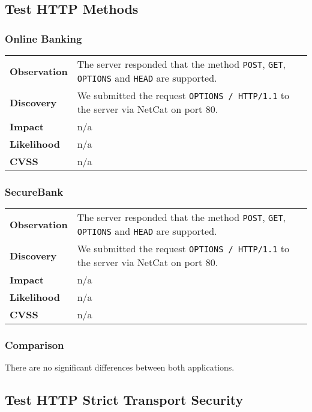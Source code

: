 \subsection{Test HTTP Methods}

\subsubsection*{Online Banking}

\begin{tabular}{l|p{10cm}}

\textbf{Observation} & The server responded that the method \texttt{POST}, \texttt{GET}, \texttt{OPTIONS} and \texttt{HEAD} are supported.  \\
\textbf{Discovery} & We submitted the request \texttt{OPTIONS / HTTP/1.1} to the server via NetCat on port 80. \\
\textbf{Impact} & n/a \\
\textbf{Likelihood} & n/a \\
\textbf{CVSS} & n/a \\
\end{tabular}


\subsubsection*{SecureBank}

\begin{tabular}{l|p{10cm}}

\textbf{Observation} & The server responded that the method \texttt{POST}, \texttt{GET}, \texttt{OPTIONS} and \texttt{HEAD} are supported.  \\
\textbf{Discovery} & We submitted the request \texttt{OPTIONS / HTTP/1.1} to the server via NetCat on port 80. \\
\textbf{Impact} & n/a \\
\textbf{Likelihood} & n/a \\
\textbf{CVSS} & n/a \\
\end{tabular}

\subsubsection*{Comparison}
There are no significant differences between both applications.


\clearpage
\subsection{Test HTTP Strict Transport Security}

